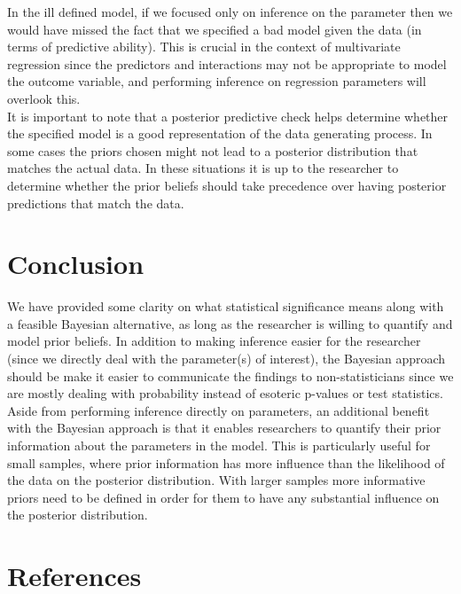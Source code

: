 \documentclass[12pt]{article}
\begin{document}
\noindent In the ill defined model, if we focused only on inference on the parameter then we would have missed the fact that we specified a bad model given the data (in terms of predictive ability). This is crucial in the context of multivariate regression since the predictors and interactions may not be appropriate to model the outcome variable, and performing inference on regression parameters will overlook this. \\

\noindent It is important to note that a posterior predictive check helps determine whether the specified model is a good representation of the data generating process. In some cases the priors chosen might not lead to a posterior distribution that matches the actual data. In these situations it is up to the researcher to determine whether the prior beliefs should take precedence over having posterior predictions that match the data. \\

\section{Conclusion}

\noindent We have provided some clarity on what statistical significance means along with a feasible Bayesian alternative, as long as the researcher is willing to quantify and model prior beliefs. In addition to making inference easier for the researcher (since we directly deal with the parameter(s) of interest), the Bayesian approach should be make it easier to communicate the findings to non-statisticians since we are mostly dealing with probability instead of esoteric p-values or test statistics. \\

\noindent Aside from performing inference directly on parameters, an additional benefit with the Bayesian approach is that it enables researchers to quantify their prior information about the parameters in the model. This is particularly useful for small samples, where prior information has more influence than the likelihood of the data on the posterior distribution. With larger samples more informative priors need to be defined in order for them to have any substantial influence on the posterior distribution.

\pagebreak

\section{References}
\end{document}

